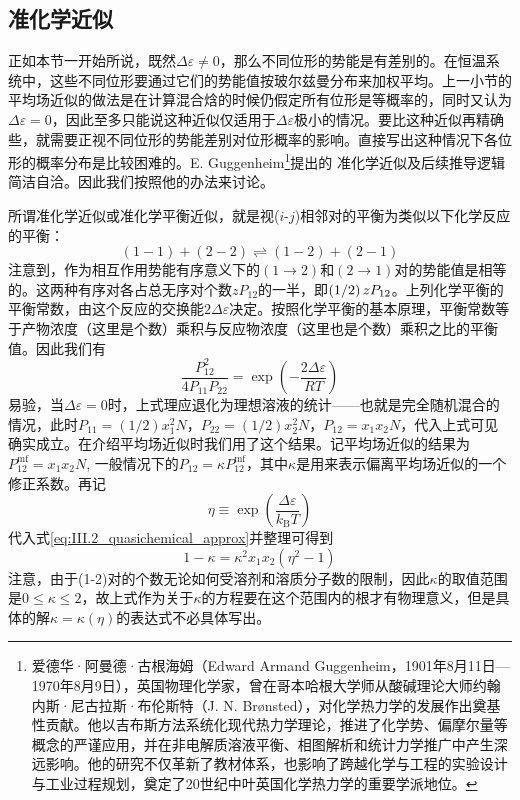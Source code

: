 \documentclass[main.tex]{subfiles}
\begin{document}
\subsection{准化学近似}
正如本节一开始所说，既然$\Delta\varepsilon\neq 0$，那么不同位形的势能是有差别的。在恒温系统中，这些不同位形要通过它们的势能值按玻尔兹曼分布来加权平均。上一小节的平均场近似的做法是在计算混合焓的时候仍假定所有位形是等概率的，同时又认为$\Delta\varepsilon=0$，因此至多只能说这种近似仅适用于$\Delta\varepsilon$极小的情况。要比这种近似再精确些，就需要正视不同位形的势能差别对位形概率的影响。直接写出这种情况下各位形的概率分布是比较困难的。E. Guggenheim\footnote{爱德华·阿曼德·古根海姆（Edward Armand Guggenheim，1901年8月11日---1970年8月9日），英国物理化学家，曾在哥本哈根大学师从酸碱理论大师约翰内斯·尼古拉斯·布伦斯特（J. N. Brønsted），对化学热力学的发展作出奠基性贡献。他以吉布斯方法系统化现代热力学理论，推进了化学势、偏摩尔量等概念的严谨应用，并在非电解质溶液平衡、相图解析和统计力学推广中产生深远影响。他的研究不仅革新了教材体系，也影响了跨越化学与工程的实验设计与工业过程规划，奠定了20世纪中叶英国化学热力学的重要学派地位。}提出的
准化学近似及后续推导逻辑简洁自洽。因此我们按照他的办法来讨论。

所谓准化学近似或准化学平衡近似，就是视($i$-$j$)相邻对的平衡为类似以下化学反应的平衡：
\[(1-1)+(2-2)\rightleftharpoons(1-2)+(2-1)\]
注意到，作为相互作用势能有序意义下的$(1\rightarrow 2)$和$(2\rightarrow 1)$对的势能值是相等的。这两种有序对各占总无序对个数$zP_{12}$的一半，即$\left(1\middle/2\right)zP_{12}$。上列化学平衡的平衡常数，由这个反应的交换能$2\Delta\varepsilon$决定。按照化学平衡的基本原理，平衡常数等于产物浓度（这里是个数）乘积与反应物浓度（这里也是个数）乘积之比的平衡值。因此我们有
\begin{equation}\label{eq:III.2_quasichemical_approx}
  \frac{P_{12}^2}{4P_{11}P_{22}}=\exp\left(-\frac{2\Delta\varepsilon}{RT}\right)
\end{equation}
易验，当$\Delta\varepsilon=0$时，上式理应退化为理想溶液的统计——也就是完全随机混合的情况，此时$P_{11}=(1/2)x_1^2N$，$P_{22}=(1/2)x_2^2N$，$P_{12}=x_1x_2N$，代入上式可见确实成立。在介绍平均场近似时我们用了这个结果。记平均场近似的结果为$P^\text{mf}_{12}=x_1x_2N$, 一般情况下的$P_{12}=\kappa P^\text{mf}_{12}$，其中$\kappa$是用来表示偏离平均场近似的一个修正系数。再记
\[\eta\equiv\exp\left(\frac{\Delta\varepsilon}{k_\text{B}T}\right)\]
代入式\eqref{eq:III.2_quasichemical_approx}并整理可得到
\begin{equation}\label{eq:III.2_kappa_eta_relation}
  1-\kappa=\kappa^2x_1x_2\left(\eta^2-1\right)
\end{equation}
注意，由于(1-2)对的个数无论如何受溶剂和溶质分子数的限制，因此$\kappa$的取值范围是$0\leq\kappa\leq 2$，故上式作为关于$\kappa$的方程要在这个范围内的根才有物理意义，但是具体的解$\kappa=\kappa\left(\eta\right)$的表达式不必具体写出。
\end{document}

